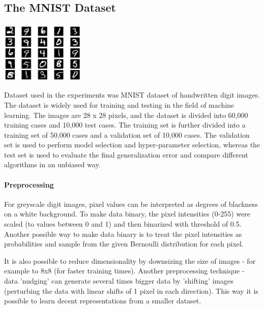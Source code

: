 \documentclass[a4paper]{scrartcl}
\begin{document}
\subsection{The MNIST Dataset}
\begin{center}
\includegraphics[width=4cm]{images/mnist2.png}
\end{center}
\par Dataset used in the experiments was MNIST dataset of handwritten digit images. The dataset is widely used for training and testing in the field of machine learning. The images are 28 x 28 pixels, and the dataset is divided into 60,000 training cases and 10,000 test cases. The training set is further divided into a training set of 50,000 cases and a validation set of 10,000 cases. The validation set is used to perform model selection and hyper-parameter selection, whereas the test set is used to evaluate the final generalization error and compare different algorithms in an unbiased way.
\paragraph{Preprocessing} For greyscale digit images, pixel values can be interpreted as degrees of blackness on a white background. To make data binary, the pixel intensities (0-255) were scaled (to values between 0 and 1) and then binarized with threshold of 0.5. Another possible way to make data binary is to treat the pixel intensities as probabilities and sample from the given Bernoulli distribution for each pixel. 
\par It is also possible to reduce dimensionality by downsizing the size of images - for example to 8x8 (for faster training times). Another preprocessing technique - data 'nudging' can generate several times bigger data by 'shifting' images (perturbing the data with linear shifts of 1 pixel in each direction). This way it is possible to learn decent representations from a smaller dataset.
\end{document}
